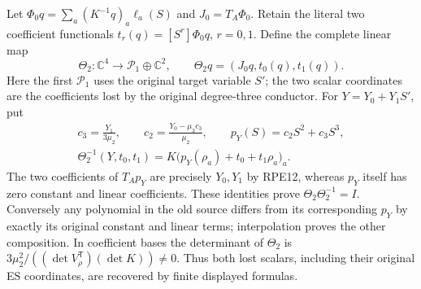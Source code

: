 \documentclass[11pt]{article}
\begin{document}
Let $\Phi_0q=\sum_a(K^{-1}q)_a\ell_a(S)$ and
$J_0=T_A\Phi_0$. Retain the literal two coefficient functionals
$t_r(q)=[S^r]\Phi_0q$, $r=0,1$. Define the complete linear map
\[
 \Theta_2:\mathbb C^4\longrightarrow\mathcal P_1\oplus\mathbb C^2,
 \qquad \Theta_2q=(J_0q,t_0(q),t_1(q)).
 \tag{RPE20}
\]
Here the first $\mathcal P_1$ uses the original target variable $S'$;
the two scalar coordinates are the coefficients lost by the original
degree-three conductor. For $Y=Y_0+Y_1S'$, put
\[
 \begin{gathered}
 c_3=\frac{Y_1}{3\mu_2},\qquad
 c_2=\frac{Y_0-\mu_3c_3}{\mu_2},\qquad
 p_Y(S)=c_2S^2+c_3S^3,\\
 \Theta_2^{-1}(Y,t_0,t_1)
       =K\bigl(p_Y(\rho_a)+t_0+t_1\rho_a\bigr)_a.
 \end{gathered}\tag{RPE21}
\]
The two coefficients of $T_Ap_Y$ are precisely $Y_0,Y_1$ by
RPE12, whereas $p_Y$ itself has zero constant and linear coefficients.
These identities prove $\Theta_2\Theta_2^{-1}=I$.
Conversely any polynomial in the old source differs from its
corresponding $p_Y$ by exactly its original constant and linear
terms; interpolation proves the other composition. In coefficient
bases the determinant of $\Theta_2$ is
$3\mu_2^2/((\det V_\rho^{\mathsf T})(\det K))\ne0$.
Thus both lost scalars, including their original ES coordinates,
are recovered by finite displayed formulas.
\end{document}
